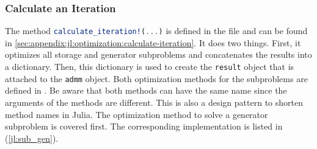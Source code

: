 \subsubsection*{Calculate an Iteration}

The method \lstinline[language=julia]{calculate_iteration!(...)} is defined in the file  and can be found in \ref{sec:appendix:jl:optimization:calculate-iteration}. It does two things. First, it optimizes all storage and generator subproblems and concatenates the results into a dictionary. Then, this dictionary is used to create the \lstinline[language=julia]{result} object that is attached to the \lstinline[language=julia]{admm} object. Both optimization methods for the subproblems are defined in . Be aware that both methods can have the same name since the arguments of the methods are different. This is also a design pattern to shorten method names in Julia. The optimization method to solve a generator subproblem is covered first. The corresponding implementation is listed in (\ref{jl:sub_gen}).



